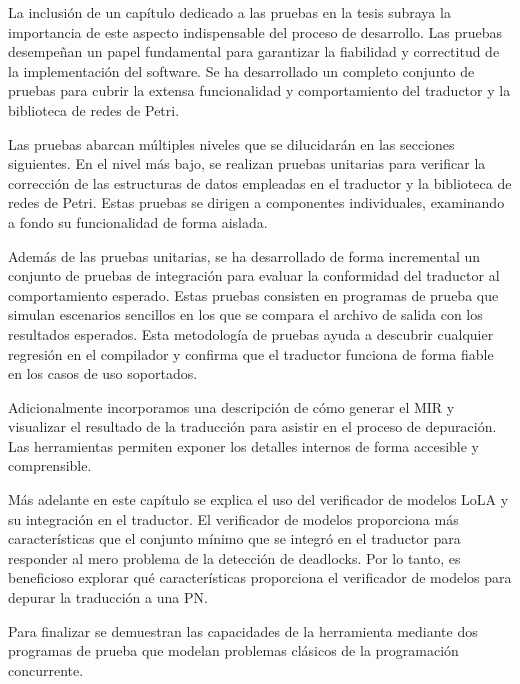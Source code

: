 La inclusión de un capítulo dedicado a las pruebas en la tesis subraya la importancia de este
aspecto indispensable del proceso de desarrollo. Las pruebas desempeñan un papel
fundamental para garantizar la fiabilidad y correctitud de la implementación del software. Se ha
desarrollado un completo conjunto de pruebas para cubrir la extensa funcionalidad y
comportamiento del traductor y la biblioteca de redes de Petri.

Las pruebas abarcan múltiples niveles que se dilucidarán en las secciones siguientes. En el
nivel más bajo, se realizan pruebas unitarias para verificar la corrección de las estructuras de
datos empleadas en el traductor y la biblioteca de redes de Petri. Estas pruebas se dirigen a componentes
individuales, examinando a fondo su funcionalidad de forma aislada.

Además de las pruebas unitarias, se ha desarrollado de forma incremental un conjunto de pruebas
de integración para evaluar la conformidad del traductor al comportamiento esperado. Estas
pruebas consisten en programas de prueba que simulan escenarios sencillos en los que se
compara el archivo de salida con los resultados esperados. Esta metodología de
pruebas ayuda a descubrir cualquier regresión en el compilador y confirma que el traductor
funciona de forma fiable en los casos de uso soportados.

Adicionalmente incorporamos una descripción de cómo generar el \acrshort{MIR} y visualizar el resultado de la
traducción para asistir en el proceso de depuración. Las herramientas permiten exponer los
detalles internos de forma accesible y comprensible.

Más adelante en este capítulo se explica el uso del verificador de modelos \acrshort{LoLA} y su
integración en el traductor. El verificador de modelos proporciona más características que el
conjunto mínimo que se integró en el traductor para responder al mero problema de la detección de
deadlocks. Por lo tanto, es beneficioso explorar qué características proporciona el verificador de
modelos para depurar la traducción a una \acrshort{PN}.

Para finalizar se demuestran las capacidades de la herramienta mediante dos programas de prueba
que modelan problemas clásicos de la programación concurrente.